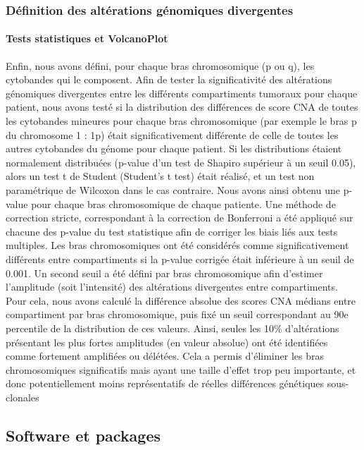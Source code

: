 \documentclass[11pt]{article}
\begin{document}
\subsubsection{Définition des altérations génomiques divergentes}

\paragraph{Tests statistiques et VolcanoPlot}

Enfin, nous avons défini, pour chaque bras chromosomique (p ou q), les cytobandes qui le composent. Afin de tester la significativité des altérations génomiques divergentes entre les différents compartiments tumoraux pour chaque patient, nous avons testé si la distribution des différences de score CNA de toutes les cytobandes mineures pour chaque bras chromosomique (par exemple le bras p du chromosome 1 : 1p) était significativement différente de celle de toutes les autres cytobandes du génome pour chaque patient. Si les distributions étaient normalement distribuées (p-value d’un test de Shapiro supérieur à un seuil 0.05), alors un test t de Student (Student’s t test) était réalisé, et un test non paramétrique de Wilcoxon dans le cas contraire. Nous avons ainsi obtenu une p-value pour chaque bras chromosomique de chaque patiente. Une méthode de correction stricte, correspondant à la correction de Bonferroni a été appliqué sur chacune des p-value du test statistique afin de corriger les biais liés aux tests multiples. Les bras chromosomiques ont été considérés comme significativement différents entre compartiments si la p-value corrigée était inférieure à un seuil de 0.001. Un second seuil a été défini par bras chromosomique afin d’estimer l’amplitude (soit l’intensité) des altérations divergentes entre compartiments. Pour cela, nous avons calculé la différence absolue des scores CNA médians entre compartiment par bras chromosomique, puis fixé un seuil correspondant au 90e percentile de la distribution de ces valeurs. Ainsi, seules les 10\% d’altérations présentant les plus fortes amplitudes (en valeur absolue) ont été identifiées comme fortement amplifiées ou délétées. Cela a permis d’éliminer les bras chromosomiques significatifs mais ayant une taille d’effet trop peu importante, et donc potentiellement moins représentatifs de réelles différences génétiques sous-clonales

\subsection{Software et packages}
\end{document}
